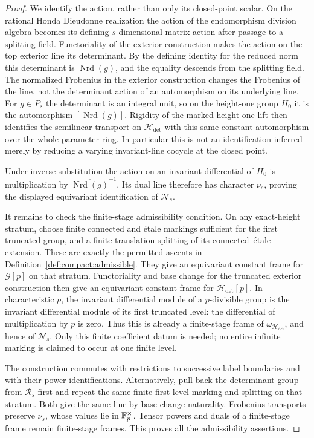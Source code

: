 \begin{proof}
We identify the action, rather than only its closed-point scalar.
On the rational Honda Dieudonne realization the action of the
endomorphism division algebra becomes its defining $s$-dimensional
matrix action after passage to a splitting field.  Functoriality of
the exterior construction makes the action on the top exterior
line its determinant.  By the defining identity for the reduced
norm this determinant is $\operatorname{Nrd}(g)$, and the equality
descends from the splitting field.  The normalized Frobenius in the
exterior construction changes the Frobenius of the line, not the
determinant action of an automorphism on its underlying line.
For $g\in P_s$ the determinant is an integral unit, so on the
height-one group $H_0$ it is the automorphism
$[\operatorname{Nrd}(g)]$.  Rigidity of the marked height-one lift
then identifies the semilinear transport on
$\mathcal H_{\det}$ with this same constant automorphism over
the whole parameter ring.  In particular this is not an
identification inferred merely by reducing a varying invariant-line
cocycle at the closed point.

Under inverse substitution the action on an invariant differential
of $H_0$ is multiplication by
$\overline{\operatorname{Nrd}(g)}^{-1}$.
Its dual line therefore has character $\nu_s$, proving the
displayed equivariant identification of $\mathcal N_s$.

It remains to check the finite-stage admissibility condition.
On any exact-height stratum, choose finite connected and \'{e}tale
markings sufficient for the first truncated group, and a finite
translation splitting of its connected--\'{e}tale extension.
These are exactly the permitted ascents in
Definition~\ref{def:compact:admissible}.  They give an equivariant
constant frame for $\mathcal G[p]$ on that stratum.  Functoriality
and base change for the truncated exterior construction then give
an equivariant constant frame for $\mathcal H_{\det}[p]$.
In characteristic $p$, the invariant differential module of a
$p$-divisible group is the invariant differential module of its
first truncated level: the differential of multiplication by $p$
is zero.  Thus this is already a finite-stage frame of
$\omega_{\mathcal H_{\det}}$, and hence of $\mathcal N_s$.
Only this finite coefficient datum is needed; no entire infinite
marking is claimed to occur at one finite level.

The construction commutes with restrictions to successive label
boundaries and with their power identifications.  Alternatively,
pull back the determinant group from $\mathcal R_s$ first and
repeat the same finite first-level marking and splitting on that
stratum.  Both give the same line by base-change naturality.
Frobenius transports preserve $\nu_s$, whose values lie in
$\mathbb F_p^\times$.  Tensor powers and duals of a finite-stage frame
remain finite-stage frames.  This proves all the admissibility
assertions.
\end{proof}


